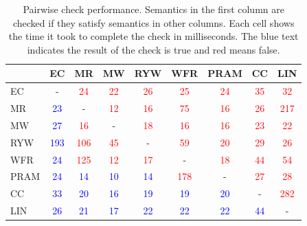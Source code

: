 \newcommand{\tableT}{\textcolor{blue}{T}}
\newcommand{\tableF}{\textcolor{red}{F}}
\newcommand{\tableNA}{-}
\begin{table}[t]
  \centering
  \begin{tabular}{|l|c|c|c|c|c|c|c|c|}
    \hline
    {} &
    EC &
    MR &
    MW &
    RYW &
    WFR &
    PRAM &
    CC &
    LIN \\
    \hline
    EC   & \tableNA & \textcolor{red}{24} & \textcolor{red}{22} &
    \textcolor{red}{26} & \textcolor{red}{25} & \textcolor{red}{24} &
    \textcolor{red}{35} & \textcolor{red}{32} \\
    MR   & \textcolor{blue}{23} & \tableNA & \textcolor{red}{12} &
    \textcolor{red}{16} & \textcolor{red}{75} & \textcolor{red}{16} &
    \textcolor{red}{26} & \textcolor{red}{217} \\
    MW   & \textcolor{blue}{27} & \textcolor{red}{16} & \tableNA &
    \textcolor{red}{18} & \textcolor{red}{16} & \textcolor{red}{16} &
    \textcolor{red}{23} & \textcolor{red}{22} \\
    RYW  & \textcolor{blue}{193} & \textcolor{red}{106} &
    \textcolor{red}{45} & \tableNA & \textcolor{red}{59} &
    \textcolor{red}{20} & \textcolor{red}{29} & \textcolor{red}{26} \\
    WFR  & \textcolor{blue}{24} & \textcolor{red}{125} &
    \textcolor{red}{12} & \textcolor{red}{17} & \tableNA &
    \textcolor{red}{18} & \textcolor{red}{44} & \textcolor{red}{54} \\
    PRAM & \textcolor{blue}{24} & \textcolor{blue}{14} &
    \textcolor{blue}{10} & \textcolor{blue}{14} &
    \textcolor{red}{178} & \tableNA & \textcolor{red}{27} &
    \textcolor{red}{28} \\
    CC   & \textcolor{blue}{33} & \textcolor{blue}{20} &
    \textcolor{blue}{16} & \textcolor{blue}{19} &
    \textcolor{blue}{19} & \textcolor{blue}{20} & \tableNA &
    \textcolor{red}{282} \\
    LIN  & \textcolor{blue}{26} & \textcolor{blue}{21} &
    \textcolor{blue}{17} & \textcolor{blue}{22} &
    \textcolor{blue}{22} & \textcolor{blue}{22} &
    \textcolor{blue}{44} & \tableNA \\
    \hline
  \end{tabular}
  \caption{Pairwise check performance. Semantics in the first column
    are checked if they satisfy semantics in other columns. Each cell
    shows the time it took to complete the check in milliseconds. The
  blue text indicates the result of the check is true and red means false. }
  \label{tab:pairwise-time}
\end{table}

